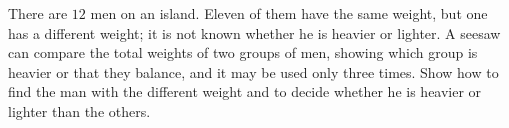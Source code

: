 There are $12$ men on an island. Eleven of them have the same weight, but one has a different weight; it is not known whether he is heavier or lighter. A seesaw can compare the total weights of two groups of men, showing which group is heavier or that they balance, and it may be used only three times. Show how to find the man with the different weight and to decide whether he is heavier or lighter than the others.
